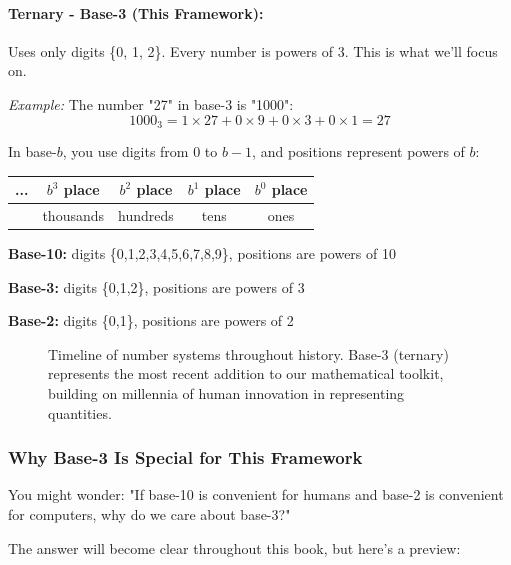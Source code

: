\paragraph{Ternary - Base-3 (This Framework):} Uses only digits \{0, 1, 2\}. Every number is powers of 3. This is what we'll focus on.

\textit{Example:} The number "27" in base-3 is "1000":
\begin{equation}
1000_3 = 1×27 + 0×9 + 0×3 + 0×1 = 27
\end{equation}

\begin{intuitive}
In base-$b$, you use digits from 0 to $b-1$, and positions represent powers of $b$:

\begin{center}
\begin{tabular}{ccccc}
... & $b^3$ place & $b^2$ place & $b^1$ place & $b^0$ place \\
\hline
& thousands & hundreds & tens & ones \\
\end{tabular}
\end{center}

\textbf{Base-10:} digits \{0,1,2,3,4,5,6,7,8,9\}, positions are powers of 10

\textbf{Base-3:} digits \{0,1,2\}, positions are powers of 3

\textbf{Base-2:} digits \{0,1\}, positions are powers of 2
\end{intuitive}

\begin{figure}[h]
\centering

\caption{Timeline of number systems throughout history. Base-3 (ternary) represents the most recent addition to our mathematical toolkit, building on millennia of human innovation in representing quantities.}
\label{fig:timeline}
\end{figure}

\subsubsection*{Why Base-3 Is Special for This Framework}

You might wonder: "If base-10 is convenient for humans and base-2 is convenient for computers, why do we care about base-3?"

The answer will become clear throughout this book, but here's a preview:

